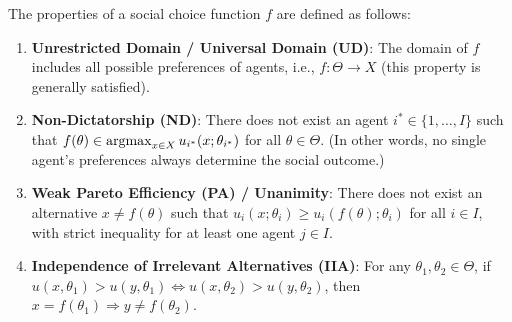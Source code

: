 \documentclass[11pt]{elegantbook_2}
\newcommand{\argmax}{\operatornamewithlimits{argmax}}
\begin{document}
\begin{definition}\label{SWF_properties}
    The properties of a social choice function $f$ are defined as follows:
    \begin{enumerate}[$\circ$]
        \item \textbf{Unrestricted Domain / Universal Domain (UD)}: The domain of $f$ includes all possible preferences of agents, i.e., $f:\Theta \rightarrow X$ (this property is generally satisfied).
        \item \textbf{Non-Dictatorship (ND)}: There does not exist an agent $i^* \in \{1, \dots, I\}$ such that $f(\theta) \in \argmax_{x \in X} u_{i^*}(x; \theta_{i^*})$ for all $\theta \in \Theta$. (In other words, no single agent's preferences always determine the social outcome.)
        \item \textbf{Weak Pareto Efficiency (PA) / Unanimity}: There does not exist an alternative $x \neq f(\theta)$ such that $u_i(x; \theta_i) \geq u_i(f(\theta); \theta_i)$ for all $i \in I$, with strict inequality for at least one agent $j \in I$.
        \item \textbf{Independence of Irrelevant Alternatives (IIA)}: For any $\theta_1, \theta_2 \in \Theta$, if $u(x, \theta_1) > u(y, \theta_1) \Leftrightarrow u(x, \theta_2) > u(y, \theta_2)$, then $x = f(\theta_1) \Rightarrow y \neq f(\theta_2)$.
    \end{enumerate}
\end{definition}
\end{document}

